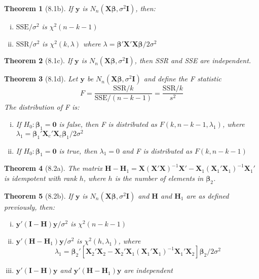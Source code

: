 \documentclass{article}
\newtheorem{theorem}{Theorem}[section]
\begin{document}
\begin{theorem}[8.1b]
If $\mathbf{y}$ is $N_n(\mathbf{X}\boldsymbol{\beta}, \sigma^2\mathbf{I})$, then:
\begin{enumerate}[(i)]
\item $\text{SSE}/\sigma^2$ is $\chi^2(n-k-1)$
\item $\text{SSR}/\sigma^2$ is $\chi^2(k,\lambda)$ where $\lambda = \boldsymbol{\beta}'\mathbf{X}'\mathbf{X}\boldsymbol{\beta}/2\sigma^2$
\end{enumerate}
\end{theorem}

\begin{theorem}[8.1c]
If $\mathbf{y}$ is $N_n(\mathbf{X}\boldsymbol{\beta}, \sigma^2\mathbf{I})$, then SSR and SSE are independent.
\end{theorem}

\begin{theorem}[8.1d]
Let $\mathbf{y}$ be $N_n(\mathbf{X}\boldsymbol{\beta}, \sigma^2\mathbf{I})$ and define the F statistic
\[F = \frac{\text{SSR}/k}{\text{SSE}/(n-k-1)} = \frac{\text{SSR}/k}{s^2}\]
The distribution of F is:
\begin{enumerate}[(i)]
\item If $H_0: \boldsymbol{\beta}_1 = \mathbf{0}$ is false, then F is distributed as $F(k,n-k-1,\lambda_1)$, where $\lambda_1 = \boldsymbol{\beta}_1'\mathbf{X}_c'\mathbf{X}_c\boldsymbol{\beta}_1/2\sigma^2$
\item If $H_0: \boldsymbol{\beta}_1 = \mathbf{0}$ is true, then $\lambda_1 = 0$ and F is distributed as $F(k,n-k-1)$
\end{enumerate}
\end{theorem}

\begin{theorem}[8.2a]
The matrix $\mathbf{H} - \mathbf{H}_1 = \mathbf{X}(\mathbf{X}'\mathbf{X})^{-1}\mathbf{X}' - \mathbf{X}_1(\mathbf{X}_1'\mathbf{X}_1)^{-1}\mathbf{X}_1'$ is idempotent with rank $h$, where $h$ is the number of elements in $\boldsymbol{\beta}_2$.
\end{theorem}

\begin{theorem}[8.2b]
If $\mathbf{y}$ is $N_n(\mathbf{X}\boldsymbol{\beta}, \sigma^2\mathbf{I})$ and $\mathbf{H}$ and $\mathbf{H}_1$ are as defined previously, then:
\begin{enumerate}[(i)]
\item $\mathbf{y}'(\mathbf{I}-\mathbf{H})\mathbf{y}/\sigma^2$ is $\chi^2(n-k-1)$
\item $\mathbf{y}'(\mathbf{H}-\mathbf{H}_1)\mathbf{y}/\sigma^2$ is $\chi^2(h,\lambda_1)$, where 
\[\lambda_1 = \boldsymbol{\beta}_2'[\mathbf{X}_2'\mathbf{X}_2 - \mathbf{X}_2'\mathbf{X}_1(\mathbf{X}_1'\mathbf{X}_1)^{-1}\mathbf{X}_1'\mathbf{X}_2]\boldsymbol{\beta}_2/2\sigma^2\]
\item $\mathbf{y}'(\mathbf{I} - \mathbf{H})\mathbf{y}$ and $\mathbf{y}'(\mathbf{H} - \mathbf{H}_1)\mathbf{y}$ are independent
\end{enumerate}
\end{theorem}
\end{document}
